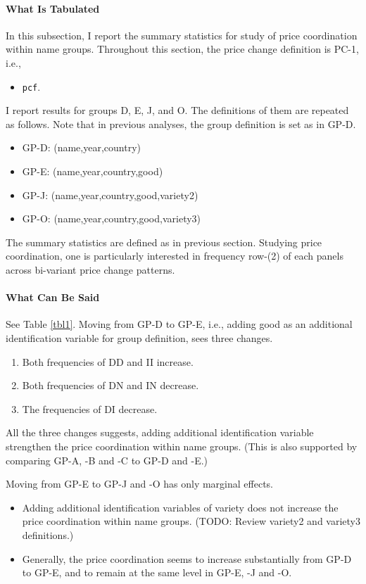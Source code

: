 \paragraph{What Is Tabulated}

In this subsection, I report the summary statistics for study of price coordination within name groups. Throughout this section, the price change definition is PC-1, i.e.,
\begin{itemize}
	\item \texttt{pcf}.
\end{itemize}
I report results for groups D, E, J, and O. The definitions of them are repeated as follows. Note that in previous analyses, the group definition is set as in GP-D.
\begin{itemize}
	\item GP-D: (name,year,country)
	\item GP-E: (name,year,country,good)
	\item GP-J: (name,year,country,good,variety2)
	\item GP-O: (name,year,country,good,variety3)
\end{itemize}
The summary statistics are defined as in previous section. Studying price coordination, one is particularly interested in frequency row-(2) of each panels across bi-variant price change patterns.

\paragraph{What Can Be Said}

See Table \ref{tbl1}. Moving from GP-D to GP-E, i.e., adding good as an additional identification variable for group definition, sees three changes.
\begin{enumerate}
	\item Both frequencies of DD and II increase.
	\item Both frequencies of DN and IN decrease.
	\item The frequencies of DI decrease.
\end{enumerate}
All the three changes suggests, adding additional identification variable strengthen the price coordination within name groups. (This is also supported by comparing GP-A, -B and -C to GP-D and -E.)

Moving from GP-E to GP-J and -O has only marginal effects.
\begin{itemize}
	\item Adding additional identification variables of variety does not increase the price coordination within name groups. (TODO: Review variety2 and variety3 definitions.)
	\item Generally, the price coordination seems to increase substantially from GP-D to GP-E, and to remain at the same level in GP-E, -J and -O.
\end{itemize}

